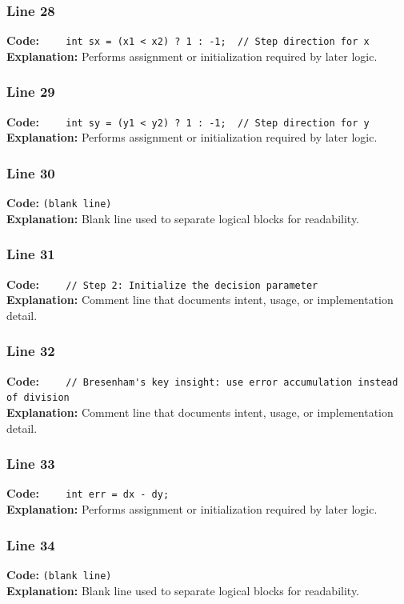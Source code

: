 \documentclass[11pt,a4paper]{article}
\begin{document}
\subsubsection*{Line 28}
\textbf{Code:} \verb|    int sx = (x1 < x2) ? 1 : -1;  // Step direction for x|\\
\textbf{Explanation:} Performs assignment or initialization required by later logic.

\subsubsection*{Line 29}
\textbf{Code:} \verb|    int sy = (y1 < y2) ? 1 : -1;  // Step direction for y|\\
\textbf{Explanation:} Performs assignment or initialization required by later logic.

\subsubsection*{Line 30}
\textbf{Code:} \texttt{(blank line)}\\
\textbf{Explanation:} Blank line used to separate logical blocks for readability.

\subsubsection*{Line 31}
\textbf{Code:} \verb|    // Step 2: Initialize the decision parameter|\\
\textbf{Explanation:} Comment line that documents intent, usage, or implementation detail.

\subsubsection*{Line 32}
\textbf{Code:} \verb|    // Bresenham's key insight: use error accumulation instead of division|\\
\textbf{Explanation:} Comment line that documents intent, usage, or implementation detail.

\subsubsection*{Line 33}
\textbf{Code:} \verb|    int err = dx - dy;|\\
\textbf{Explanation:} Performs assignment or initialization required by later logic.

\subsubsection*{Line 34}
\textbf{Code:} \texttt{(blank line)}\\
\textbf{Explanation:} Blank line used to separate logical blocks for readability.
\end{document}
